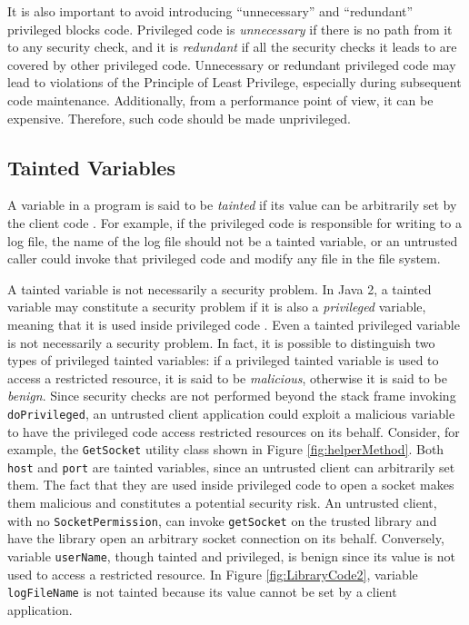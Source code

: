 It is also important to avoid introducing ``unnecessary'' and
``redundant'' privileged blocks code.  Privileged code is
\emph{unnecessary} if there is no path from it to any security
check, and it is \emph{redundant} if all the security checks it
leads to are covered by other privileged code. Unnecessary or
redundant privileged code may lead to violations of the Principle
of Least Privilege, especially during subsequent code maintenance.
Additionally, from a performance point of view, it can be
expensive.  Therefore, such code should be made unprivileged.

\subsection{Tainted Variables}

A variable in a program is said to be \emph{tainted} if its value
can be arbitrarily set by the client code
\cite{Web:SecCodeGuidelines}. For example, if the privileged code
is responsible for writing to a log file, the name of the log file
should not be a tainted variable, or an untrusted caller could
invoke that privileged code and modify any file in the file
system.

A tainted variable is not necessarily a security problem.  In Java
2, a tainted variable may constitute a security problem if it is
also a \emph{privileged} variable, meaning that it is used inside
privileged code \cite{Web:SecCodeGuidelines}.  Even a tainted
privileged variable is not necessarily a security problem.  In
fact, it is possible to distinguish two types of privileged
tainted variables: if a privileged tainted variable is used to
access a restricted resource, it is said to be \emph{malicious},
otherwise it is said to be \emph{benign}. Since security checks
are not performed beyond the stack frame invoking
\texttt{doPrivileged}, an untrusted client application could
exploit a malicious variable to have the privileged code access
restricted resources on its behalf. Consider, for example, the
\texttt{GetSocket} utility class shown in Figure
\ref{fig:helperMethod}. Both \texttt{host} and \texttt{port} are
tainted variables, since an untrusted client can arbitrarily set
them. The fact that they are used inside privileged code to open a
socket makes them malicious and constitutes a potential security
risk.  An untrusted client, with no \texttt{SocketPermission}, can
invoke \texttt{getSocket} on the trusted library and have the
library open an arbitrary socket connection on its behalf.
Conversely, variable \texttt{userName}, though tainted and
privileged, is benign since its value is not used to access a
restricted resource.  In Figure \ref{fig:LibraryCode2}, variable
\texttt{logFileName} is not tainted because its value cannot be
set by a client application.

